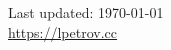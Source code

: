 \documentclass[letterpaper,11pt]{article}
\def\footerlink{https://lpetrov.cc}
\begin{document}









%
%
%
%
%
%
%

\bigskip

\begin{center}
	\begin{footnotesize}
		Last updated: \today \\ \href{\footerlink}{\url{\footerlink}}
	\end{footnotesize}
\end{center}
\end{document}
